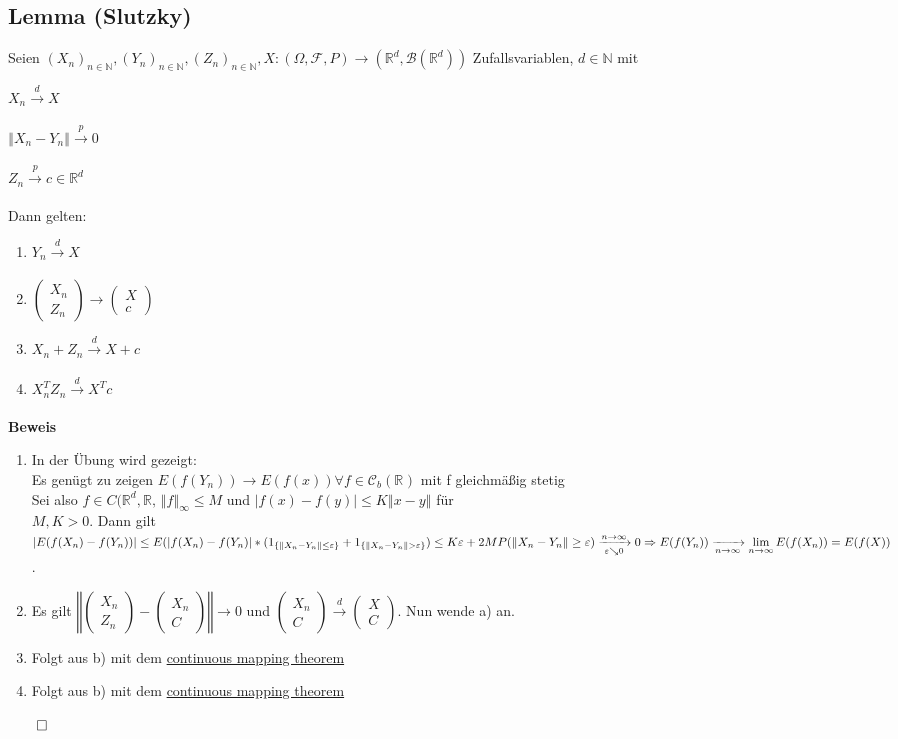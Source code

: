 \documentclass[german,10pt,oneside, fleqn, a4paper]{article}
\newcommand {\R}	{\mathbb{R}}
\newcommand {\N}	{\mathbb{N}}
\newcommand {\C}	{\mathbb{C}}
\newcommand{\Ra}	{\Rightarrow}
\newcommand{\ra}{\rightarrow}
\newcommand{\brc}[1]{\left(#1\right)}
\newcommand{\brac}[1]{\left\lbrace #1\right\rbrace}
\newcommand{\folge}[3][\N]{\left(#2_#3\right)_{#3\in #1}}
\newcommand{\norm}[1]{\left\Vert #1 \right\Vert}
\newcommand{\QED}{\begin{flushright}$\qed$\end{flushright}}
\newcommand{\mat}[1]{\begin{pmatrix}#1\end{pmatrix}}
\newcommand{\mc}[1]{\mathcal{#1}}
\newcommand{\beweis}{\textbf{Beweis}\\}
\newcommand{\toinf}{\rightarrow\infty}
\newcommand{\1}[1]{1_{#1}}
\newcommand{\2}[1]{\1{\brac{#1}}}
\newcommand{\xr}[2][]{\xrightarrow[#1]{#2}}
\newcommand{\cb}[1][d]{\mc{C}_b\brc{\R^{#1}}}
\newcommand{\rbor}[1][d]{\brc{\R^{#1},\mc{B}\brc{\R^{#1}}}}
\newcommand{\raum}{\brc{\Omega,\mc{F},P}}
\begin{document}
\subsection{Lemma (Slutzky)}
\label{3.12}
Seien $\folge{X}{n}, \folge{Y}{n}, \folge{Z}{n}, X:\raum\ra\rbor[d]$ Zufallsvariablen, $d\in\N$ mit\begin{list}{•}{}
\item $X_n\xr{d}X$
\item $\norm{X_n-Y_n}\xr{p}0$
\item $Z_n\xr{p}c\in\R^d$
\end{list}
Dann gelten:\begin{enumerate}[label=(\alph*)]
\item $Y_n\xr{d}X$
\item $\mat{X_n\\Z_n}\ra \mat{X\\c}$
\item $X_n+Z_n\xr{d}X+c$
\item $X_n^TZ_n\xr{d}X^Tc$
\end{enumerate}
\beweis
\begin{enumerate}[label=(\alph*)]
\item In der Übung wird gezeigt:\\
Es genügt zu zeigen $E(f(Y_n))\ra E(f(x))\forall f\in \cb[]$ mit f gleichmäßig stetig\\
Sei also $f\in C(\R^d,\R\text{, }\norm{f}_{\infty}\leq M$
 und $|f(x)-f(y)|\leq K\norm{x-y}$ für\\
 $M,K>0$. Dann gilt\\
$|E(f(X_n)-f(Y_n))|\leq E(|f(X_n)-f(Y_n)|*(\1{\brac{\norm{X_n-Y_n}\\
\leq\varepsilon}}+\1{\brac{\norm{X_n-Y_n}>\varepsilon}})\\
\leq K\varepsilon+2MP(\norm{X_n-Y_n}\geq\varepsilon)\xr[\varepsilon\searrow0]{n\toinf}0\\
\Ra E(f(Y_n))\xr[n\toinf]{}\lim\limits_{n\toinf}E(f(X_n))=E(f(X))$.
\item Es gilt $\norm{\mat{X_n\\Z_n}-\mat{X_n\\C}}\ra 0$ und $\mat{X_n\\C}\xr{d}\mat{X\\C}$. Nun wende a) an.
\item Folgt aus b) mit dem \hyperref[2.6]{continuous mapping theorem}
\item Folgt aus b) mit dem \hyperref[2.6]{continuous mapping theorem}
\end{enumerate}\QED
\end{document}

